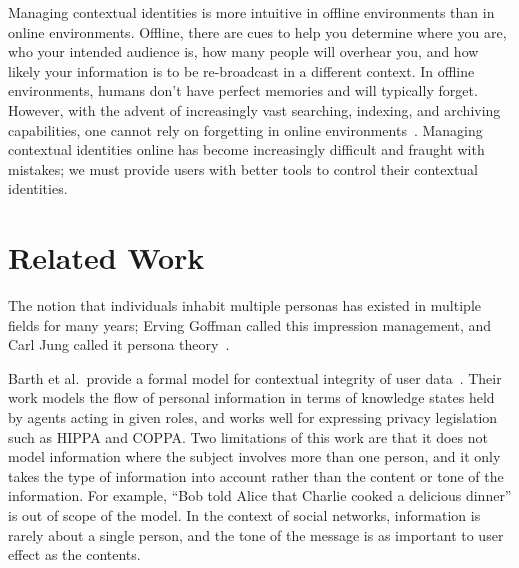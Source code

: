 \documentclass[10pt, conference, compsocconf]{IEEEtran}
\begin{document}
\begin{comment}
zuckerberg on "having multiple identities is dishonest"
http://books.google.ca/books?id=RRUkLhyGZVgC&pg=PA199&lpg=PA199&dq=%
\end{comment}

Managing contextual identities is more intuitive in offline environments than
in online environments. Offline, there are cues to help you determine where you are,
who your intended audience is, how many people will overhear you, and how
likely your information is to be re-broadcast in a different context. 
In offline environments, humans don't have perfect memories and
will typically forget.  However, with the advent of increasingly vast
searching, indexing, and archiving capabilities, one cannot rely on forgetting
in online environments~\cite{delete}. Managing contextual identities
online has become increasingly difficult and fraught with mistakes; we must
provide users with better tools to control their contextual identities.

\section{Related Work}

The notion that individuals inhabit multiple personas has existed in multiple
fields for many years; Erving Goffman called this impression management, and
Carl Jung called it persona theory~\cite{goffman,jung}.

Barth et al.~provide a formal model for contextual
integrity of user data~\cite{barth}. Their work models
the flow of personal information in terms of knowledge states held by agents
acting in given roles, and works well for expressing privacy legislation such as
HIPPA and COPPA. Two limitations of this work are that it does not
model information where the subject involves more than one person, and it
only takes the type of information into account rather than the content or tone
of the information. For example, ``Bob told Alice that Charlie cooked a
delicious dinner'' is out of scope of the model.  In the context of social
networks, information is rarely about a single person, and the tone of the
message is as important to user effect as the contents.
\end{document}
